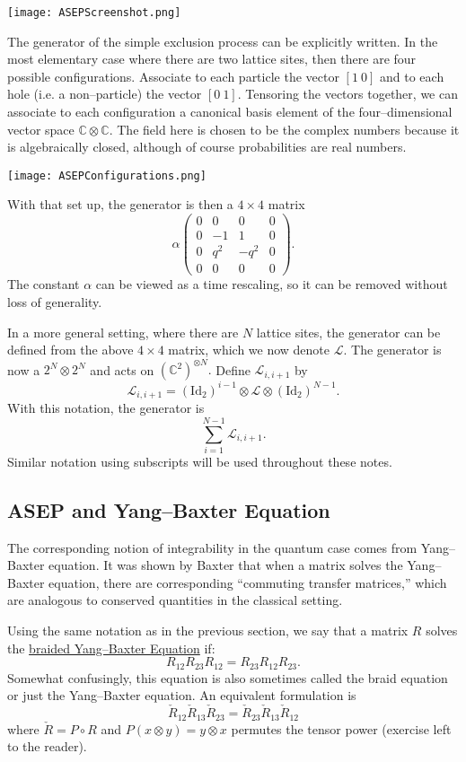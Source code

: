 \documentclass{ximera}
\begin{document}
\texttt{[image: ASEPScreenshot.png]}

The generator of the simple exclusion process can be explicitly written. In the most elementary case 
where there are two lattice sites, then there are four possible configurations. Associate to each
particle the vector $[1\ 0]$ and to each hole (i.e. a non--particle) the vector $[0 \ 1].$ Tensoring
the vectors together, we can associate to each configuration a canonical basis element of the four--dimensional
vector space $\mathbb{C}\otimes \mathbb{C}.$ The field here is chosen to be the complex numbers because
it is algebraically closed, although of course probabilities are real numbers. 

\texttt{[image: ASEPConfigurations.png]}

With that set up, the generator is then a $4\times 4$ matrix
$$
\alpha\left(
    \begin{array}{cccc}
       0 & 0 & 0 & 0 \\
       0 & -1 & 1 & 0 \\
       0 & q^2 & -q^2 & 0 \\
       0 & 0 & 0 & 0 
    \end{array}
\right).
$$
The constant $\alpha$ can be viewed as a time rescaling, so it can be removed without loss of generality. 

In a more general setting, where there are $N$ lattice sites, the generator can be defined from the
above \(4\times 4\) matrix, which we now denote \(\mathcal{L}.\) The generator is now a \(2^N \otimes 2^N\) and
acts on  \((\mathbb{C}^2)^{\otimes N}.\) Define \(\mathcal{L}_{i,i+1}\) by 
\[
\mathcal{L}_{i,i+1} = (\mathrm{Id}_2)^{i-1} \otimes \mathcal{L} \otimes (\mathrm{Id}_2)^{N-1}.
\]
With this notation, the generator is
\[
\sum_{i=1}^{N-1} \mathcal{L}_{i,i+1}.
\]
Similar notation using subscripts will be used throughout these notes.

\subsection{ASEP and Yang--Baxter Equation}
The corresponding notion of integrability in the quantum case comes from Yang--Baxter equation. 
It was shown by Baxter that when a matrix solves the Yang--Baxter equation, there are corresponding
``commuting transfer matrices,'' which are analogous to conserved quantities in the classical setting. 



Using the same notation as in the previous section, 
we say that a matrix \(R\) solves the \underline{braided Yang--Baxter Equation} if:
\[
R_{12}R_{23}R_{12} = R_{23}R_{12}R_{23}.
\]
Somewhat confusingly, this equation is also sometimes called the braid equation or just the Yang--Baxter equation.
An equivalent formulation is
\[
\check{R}_{12}\check{R}_{13}\check{R}_{23} = \check{R}_{23}\check{R}_{13}\check{R}_{12}
\]
where $\check{R} = P \circ R$ and $P(x \otimes y) = y \otimes x$ permutes the tensor power
(exercise left to the reader). 
\end{document}
